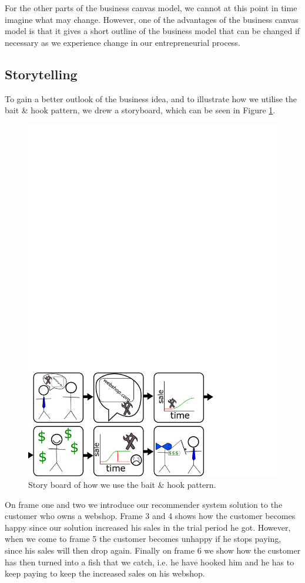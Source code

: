 For the other parts of the business canvas model, we cannot at this point in time imagine what may change. 
However, one of the advantages of the business canvas model is that it gives a short outline of the business model that can be changed if necessary as we experience change in our entrepreneurial process.

\subsection{Storytelling}
To gain a better outlook of the business idea, and to illustrate how we utilise the bait \& hook pattern, we drew a storyboard, which can be seen in Figure \cref{fig:drawing}.

\begin{figure}
	\centering
	\includegraphics[width=0.7\linewidth]{figures/drawing}
	\caption{Story board of how we use the bait \& hook pattern.}
	\label{fig:drawing}
\end{figure}
 
 On frame one and two we introduce our recommender system solution to the customer who owns a webshop.
 Frame 3 and 4 shows how the customer becomes happy since our solution increased his sales in the trial period he got.
 However, when we come to frame 5 the customer becomes unhappy if he stops paying, since his sales will then drop again.
 Finally on frame 6 we show how the customer has then turned into a fish that we catch, i.e. he have hooked him and he has to keep paying to keep the increased sales on his webshop.
 

